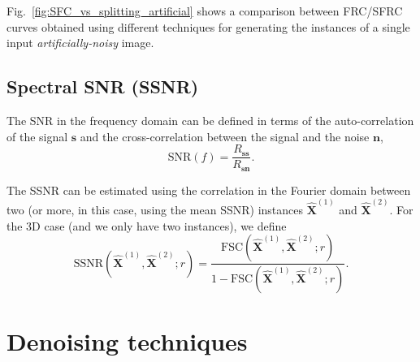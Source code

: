\documentclass{article}
\begin{document}
Fig.~\ref{fig:SFC_vs_splitting_artificial} shows a comparison
between FRC/SFRC curves obtained using different techniques for
generating the instances of a single input \emph{artificially-noisy}
image.

\subsection{Spectral SNR (SSNR)}
\label{sec:SSNR}

The SNR in the frequency domain can be defined in terms of the
auto-correlation of the signal $\mathbf{s}$ and the cross-correlation
between the signal and the noise $\mathbf{n}$,
\begin{equation}
  \text{SNR}(f) = \frac{R_{\mathbf{ss}}}{R_{\mathbf{sn}}}.
\end{equation}

The SSNR can be estimated using the correlation in the Fourier domain
between two (or more, in this case, using the mean SSNR) instances
$\hat{\mathbf{X}}^{(1)}$ and $\hat{\mathbf{X}}^{(2)}$. For the 3D case
(and we only have two instances), we define
\cite{verbeke2024self,unser1987new}
\begin{equation}
\text{SSNR}(\hat{\mathbf{X}}^{(1)}, \hat{\mathbf{X}}^{(2)}; r) = \frac{\text{FSC}(\hat{\mathbf{X}}^{(1)}, \hat{\mathbf{X}}^{(2)}; r)}{1-\text{FSC}(\hat{\mathbf{X}}^{(1)}, \hat{\mathbf{X}}^{(2)}; r)}.
\end{equation}


\section{Denoising techniques}
\end{document}
